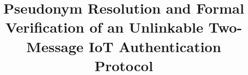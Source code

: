 \documentclass[conference]{IEEEtran}
\begin{document}
\title{Pseudonym Resolution and Formal Verification of an Unlinkable Two-Message IoT Authentication Protocol}

\maketitle

\end{document}
